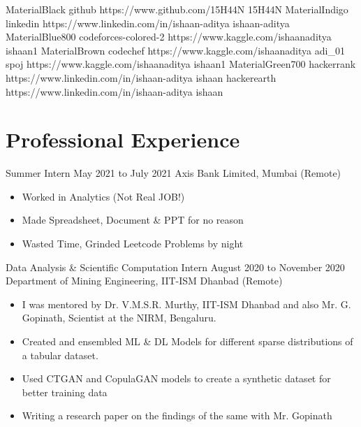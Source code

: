 \vspace{-1em}
\begin{center}
    \ProfileLink
    {MaterialBlack}
    {github}
    {https://www.github.com/15H44N}
    {15H44N}
    \LinkSep
    \ProfileLink
    {MaterialIndigo}
    {linkedin}
    {https://www.linkedin.com/in/ishaan-aditya}
    {ishaan-aditya}
    \LinkSep
    \AltProfileLink
    {MaterialBlue800}
    {codeforces-colored-2}
    {https://www.kaggle.com/ishaanaditya}
    {ishaan1}
    \LinkSep
    \AltProfileLink
    {MaterialBrown}
    {codechef}
    {https://www.kaggle.com/ishaanaditya}
    {adi\_01} %
    \LinkSep
    {spoj}
    {https://www.kaggle.com/ishaanaditya}
    {ishaan1}
    \LinkSep
    \ProfileLink
    {MaterialGreen700}
    {hackerrank}
    {https://www.linkedin.com/in/ishaan-aditya}
    {ishaan}
    \LinkSep
    {hackerearth}
    {https://www.linkedin.com/in/ishaan-aditya}
    {ishaan}
    \LinkSep
\end{center}

\section{Professional Experience}

\Experience
{Summer Intern}
{May 2021 to July 2021}
{Axis Bank Limited, Mumbai (Remote)}
\begin{itemize}
    \item Worked in Analytics (Not Real JOB!)
    \item Made Spreadsheet, Document \& PPT for no reason 
    \item Wasted Time, Grinded Leetcode Problems by night
\end{itemize}
%
\vspace{1em}
%
\Experience
{Data Analysis \& Scientific Computation Intern}
{August 2020 to November 2020}
{Department of Mining Engineering, IIT-ISM Dhanbad (Remote)}
\begin{itemize}
    \item I was mentored by Dr. V.M.S.R. Murthy, IIT-ISM Dhanbad and also Mr. G. Gopinath, Scientist at the NIRM, Bengaluru.
    \item Created and ensembled ML \& DL Models for different sparse distributions of a tabular dataset.
    \item Used CTGAN and CopulaGAN models to  create a synthetic dataset for better training data
    \item Writing a research paper on the findings of the same with Mr. Gopinath
\end{itemize}

